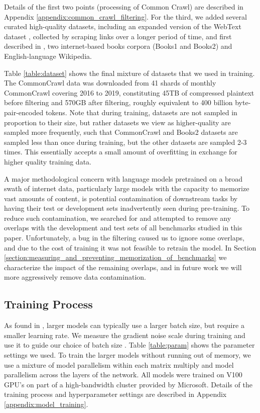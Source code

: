 Details of the first two points (processing of Common Crawl) are described in Appendix \ref{appendix:common_crawl_filtering}. For the third, we added several curated high-quality datasets, including an expanded version of the WebText dataset \cite{radford2019language}, collected by scraping links over a longer period of time, and first described in \cite{kaplan2020scaling}, two internet-based books corpora (Books1 and Books2) and English-language Wikipedia.

Table \ref{table:dataset} shows the final mixture of datasets that we used in training.  The CommonCrawl data was downloaded from 41 shards of monthly CommonCrawl covering 2016 to 2019, constituting 45TB of compressed plaintext before filtering and 570GB after filtering, roughly equivalent to 400 billion byte-pair-encoded tokens.    Note that during training, datasets are not sampled in proportion to their size, but rather datasets we view as higher-quality are sampled more frequently, such that CommonCrawl and Books2 datasets are sampled less than once during training, but the other datasets are sampled 2-3 times. This essentially accepts a small amount of overfitting in exchange for higher quality training data.

A major methodological concern with language models pretrained on a broad swath of internet data, particularly large models with the capacity to memorize vast amounts of content, is potential contamination of downstream tasks by having their test or development sets inadvertently seen during pre-training.  To reduce such contamination, we searched for and attempted to remove any overlaps with the development and test sets of all benchmarks studied in this paper.  Unfortunately, a bug in the filtering caused us to ignore some overlaps, and due to the cost of training it was not feasible to retrain the model. In Section \ref{section:measuring_and_preventing_memorization_of_benchmarks} we characterize the impact of the remaining overlaps, and in future work we will more aggressively remove data contamination. 

    \subsection{Training Process}
    \label{section:Training Process}

As found in \cite{kaplan2020scaling, mcc2018batchsize}, larger models can typically use a larger batch size, but require a smaller learning rate. We measure the gradient noise scale during training and use it to guide our choice of batch size \cite{mcc2018batchsize}. Table \ref{table:param} shows the parameter settings we used. To train the larger models without running out of memory, we use a mixture of model parallelism within each matrix multiply and model parallelism across the layers of the network.   All models were trained on V100 GPU’s on part of a high-bandwidth cluster provided by Microsoft.  Details of the training process and hyperparameter settings are described in Appendix \ref{appendix:model_training}.

